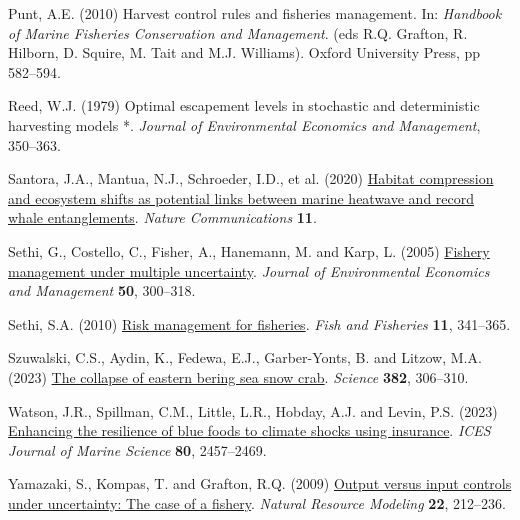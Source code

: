\documentclass[
  letterpaper,
  DIV=11,
  numbers=noendperiod]{scrartcl}
\newlength{\cslhangindent}
\newlength{\cslentryspacingunit} %
\newenvironment{CSLReferences}[2] %
 {%
  \setlength{\parindent}{0pt}
  \ifodd #1
  \let\oldpar\par
  \def\par{\hangindent=\cslhangindent\oldpar}
  \fi
  \setlength{\parskip}{#2\cslentryspacingunit}
 }%
 {}
\begin{document}
\begin{CSLReferences}{1}{0}
\leavevmode{}%
Punt, A.E. (2010) Harvest control rules and fisheries management. In:
\emph{Handbook of Marine Fisheries Conservation and Management}. (eds
R.Q. Grafton, R. Hilborn, D. Squire, M. Tait and M.J. Williams). Oxford
University Press, pp 582--594.

\leavevmode{}%
Reed, W.J. (1979) Optimal escapement levels in stochastic and
deterministic harvesting models *. \emph{Journal of Environmental
Economics and Management}, 350--363.

\leavevmode{}%
Santora, J.A., Mantua, N.J., Schroeder, I.D., et al. (2020)
\href{https://doi.org/10.1038/s41467-019-14215-w}{Habitat compression
and ecosystem shifts as potential links between marine heatwave and
record whale entanglements}. \emph{Nature Communications} \textbf{11}.

\leavevmode{}%
Sethi, G., Costello, C., Fisher, A., Hanemann, M. and Karp, L. (2005)
\href{https://doi.org/10.1016/J.JEEM.2004.11.005}{Fishery management
under multiple uncertainty}. \emph{Journal of Environmental Economics
and Management} \textbf{50}, 300--318.

\leavevmode{}%
Sethi, S.A. (2010)
\href{https://doi.org/10.1111/j.1467-2979.2010.00363.x}{Risk management
for fisheries}. \emph{Fish and Fisheries} \textbf{11}, 341--365.

\leavevmode{}%
Szuwalski, C.S., Aydin, K., Fedewa, E.J., Garber-Yonts, B. and Litzow,
M.A. (2023) \href{https://doi.org/10.1126/SCIENCE.ADF6035}{The collapse
of eastern bering sea snow crab}. \emph{Science} \textbf{382}, 306--310.

\leavevmode{}%
Watson, J.R., Spillman, C.M., Little, L.R., Hobday, A.J. and Levin, P.S.
(2023) \href{https://doi.org/10.1093/icesjms/fsad175}{Enhancing the
resilience of blue foods to climate shocks using insurance}. \emph{ICES
Journal of Marine Science} \textbf{80}, 2457--2469.

\leavevmode{}%
Yamazaki, S., Kompas, T. and Grafton, R.Q. (2009)
\href{https://doi.org/10.1111/j.1939-7445.2008.00034.x}{Output versus
input controls under uncertainty: The case of a fishery}. \emph{Natural
Resource Modeling} \textbf{22}, 212--236.

\end{CSLReferences}
\end{document}
